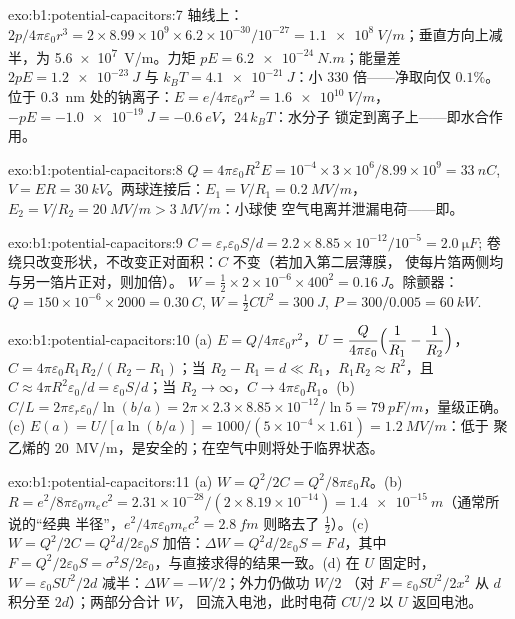 \begin{solution}{exo:b1:potential-capacitors:7}
轴线上：$2p/4\pi\varepsilon_0r^3 = 2 \times 8.99 \times 10^9 \times 6.2 \times 10^{-30}/10^{-27} =
\qty{1.1e8}{V/m}$；垂直方向上减半，为 \qty{5.6e7}{V/m}。力矩 $pE =
\qty{6.2e-24}{N.m}$；能量差 $2pE = \qty{1.2e-23}{J}$ 与 $k_BT =
\qty{4.1e-21}{J}$：小 $330$ 倍——净取向仅 $0.1\%$。
位于 \qty{0.3}{nm} 处的钠离子：$E = e/4\pi\varepsilon_0r^2 = \qty{1.6e10}{V/m}$，$-pE
= \qty{-1.0e-19}{J} = \qty{-0.6}{eV}$，$24\,k_BT$：水分子
锁定到离子上——即水合作用。
\end{solution}

\begin{solution}{exo:b1:potential-capacitors:8}
$Q = 4\pi\varepsilon_0R^2E = 10^{-4} \times 3 \times 10^6/8.99 \times 10^9 = \qty{33}{nC}$,
$V = ER = \qty{30}{kV}$。两球连接后：$E_1 = V/R_1 = \qty{0.2}{MV/m}$，
$E_2 = V/R_2 = \qty{20}{MV/m} > \qty{3}{MV/m}$：小球使
空气电离并泄漏电荷——即。
\end{solution}

\begin{solution}{exo:b1:potential-capacitors:9}
$C = \varepsilon_r\varepsilon_0S/d = 2.2 \times 8.85 \times 10^{-12}/10^{-5} = \qty{2.0}{\micro F}$;
卷绕只改变形状，不改变正对面积：$C$ 不变（若加入第二层薄膜，
使每片箔两侧均与另一箔片正对，则加倍）。
$W = \tfrac12 \times 2 \times 10^{-6} \times 400^2 = \qty{0.16}{J}$。除颤器：
$Q = 150 \times 10^{-6} \times 2000 = \qty{0.30}{C}$, $W = \tfrac12CU^2 = \qty{300}{J}$,
$P = 300/0.005 = \qty{60}{kW}$.
\end{solution}

\begin{solution}{exo:b1:potential-capacitors:10}
(a) $E = Q/4\pi\varepsilon_0r^2$，$U = \dfrac{Q}{4\pi\varepsilon_0}\Bigl(\dfrac1{R_1} -
\dfrac1{R_2}\Bigr)$，$C = 4\pi\varepsilon_0R_1R_2/(R_2 - R_1)$；当 $R_2 - R_1 = d \ll
R_1$，$R_1R_2 \approx R^2$，且 $C \approx 4\pi R^2\varepsilon_0/d = \varepsilon_0S/d$；当 $R_2 \to
\infty$，$C \to 4\pi\varepsilon_0R_1$。(b) $C/L = 2\pi\varepsilon_r\varepsilon_0/\ln(b/a) = 2\pi \times 2.3
\times 8.85 \times 10^{-12}/\ln5 = \qty{79}{pF/m}$，量级正确。(c) $E(a) =
U/[a\ln(b/a)] = 1000/(5 \times 10^{-4} \times 1.61) = \qty{1.2}{MV/m}$：低于
聚乙烯的 \qty{20}{MV/m}，是安全的；在空气中则将处于临界状态。
\end{solution}

\begin{solution}{exo:b1:potential-capacitors:11}
(a) $W = Q^2/2C = Q^2/8\pi\varepsilon_0R$。(b) $R = e^2/8\pi\varepsilon_0m_ec^2 = 2.31 \times
10^{-28}/(2 \times 8.19 \times 10^{-14}) = \qty{1.4e-15}{m}$（通常所说的“经典
半径”，$e^2/4\pi\varepsilon_0m_ec^2 = \qty{2.8}{fm}$ 则略去了 $\tfrac12$）。(c) $W =
Q^2/2C = Q^2d/2\varepsilon_0S$ 加倍：$\Delta W = Q^2d/2\varepsilon_0S = F\,d$，其中 $F =
Q^2/2\varepsilon_0S = \sigma^2S/2\varepsilon_0$，与直接求得的结果一致。(d) 在 $U$ 固定时，$W =
\varepsilon_0SU^2/2d$ 减半：$\Delta W = -W/2$；外力仍做功 $W/2$
（对 $F = \varepsilon_0SU^2/2x^2$ 从 $d$ 积分至 $2d$）；两部分合计 $W$，
回流入电池，此时电荷 $CU/2$ 以
 $U$ 返回电池。
\end{solution}

